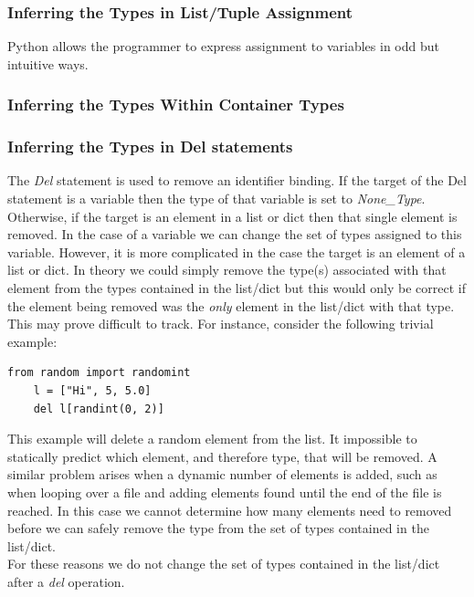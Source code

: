\documentclass[12pt, titlepage]{article}
\begin{document}
\subsubsection{Inferring the Types in List/Tuple Assignment}
Python allows the programmer to express assignment to variables in odd but intuitive ways.

\subsubsection{Inferring the Types Within Container Types}


\subsubsection{Inferring the Types in Del statements}
The \textit{Del} statement is used to remove an identifier binding. If the target of the Del statement is a variable then the type of that variable is set to \textit{None\_Type}. Otherwise, if the target is an element in a list or dict then that single element is removed. In the case of a variable we can change the set of types assigned to this variable. However, it is more complicated in the case the target is an element of a list or dict. In theory we could simply remove the type(s) associated with that element from the types contained in the list/dict but this would only be correct if the element being removed was the \textit{only} element in the list/dict with that type. This may prove difficult to track. For instance, consider the following trivial example:
\begin{lstlisting}[mathescape]
    from random import randomint
    l = ["Hi", 5, 5.0]
    del l[randint(0, 2)]
\end{lstlisting}
This example will delete a random element from the list. It impossible to statically predict which element, and therefore type, that will be removed. A similar problem arises when a dynamic number of elements is added, such as when looping over a file and adding elements found until the end of the file is reached. In this case we cannot determine how many elements need to removed before we can safely remove the type from the set of types contained in the list/dict. \\
For these reasons we do not change the set of types contained in the list/dict after a \textit{del} operation.
\end{document}
